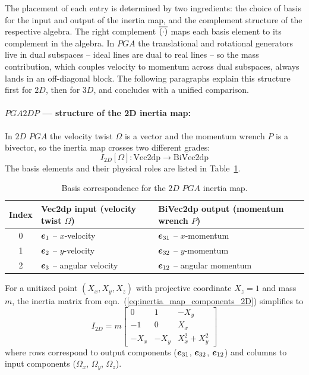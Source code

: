 The placement of each entry is determined by two ingredients: the choice of basis for the
input and output of the inertia map, and the complement structure of the respective
algebra. The right complement $\overline{(\cdot)}$ maps each basis element to its complement
in the algebra. In $PGA$ the translational and rotational generators live in dual
subspaces -- ideal lines are dual to real lines -- so the mass contribution, which couples
velocity to momentum across dual subspaces, always lands in an off-diagonal block. The
following paragraphs explain this structure first for $2D$, then for $3D$, and concludes
with a unified comparison.

\paragraph{$PGA2DP$ --- structure of the 2D inertia map:}
In $2D$ $PGA$ the velocity twist $\Omega$ is a vector and the momentum wrench $P$ is a
bivector, so the inertia map crosses two different grades:
\begin{equation}
    I_{2D}[\Omega] : \mathrm{Vec2dp} \to \mathrm{BiVec2dp}
\end{equation}
The basis elements and their physical roles are listed in Table~\ref{tab:basis_pga2dp}.

\begin{table}[!ht]
\centering\small
\begin{tabular}{c|p{5.2cm}|p{5.2cm}}
\hline
Index & Vec2dp input (velocity twist $\Omega$) & BiVec2dp output (momentum wrench $P$) \\
\hline
0 & $\bm{e}_{1}$ -- $x$-velocity & $\bm{e}_{31}$ -- $x$-momentum \\
1 & $\bm{e}_{2}$ -- $y$-velocity & $\bm{e}_{32}$ -- $y$-momentum \\
2 & $\bm{e}_{3}$ -- angular velocity  & $\bm{e}_{12}$ -- angular momentum \\
\hline
\end{tabular}
\caption{Basis correspondence for the $2D$ $PGA$ inertia map.}
\label{tab:basis_pga2dp}
\end{table}

For a unitized point $(X_x, X_y, X_z)$ with projective coordinate $X_z = 1$ and mass $m$,
the inertia matrix from eqn.~(\ref{eq:inertia_map_components_2D}) simplifies to
\begin{equation}
    I_{2D} = m
    \begin{bmatrix}
        0    &  1   & -X_y           \\
        -1   &  0   &  X_x           \\
        -X_x & -X_y & X_x^2 + X_y^2
    \end{bmatrix}
    \label{eq:inertia_2D_unitized}
\end{equation}
where rows correspond to output components ($\bm{e}_{31}$, $\bm{e}_{32}$, $\bm{e}_{12}$) and columns
to input components ($\Omega_x$, $\Omega_y$, $\Omega_z$).

